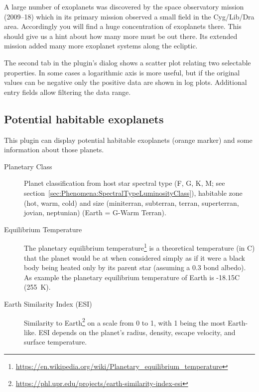 A large number of exoplanets was discovered by the  
space observatory mission (2009--18) which in its primary mission observed a small field in the Cyg/Lib/Dra area. Accordingly 
you will find a huge concentration of exoplanets there. This should give us a hint about how many more must be out there.
Its extended mission added many more exoplanet systems along the ecliptic.

The second tab in the plugin's dialog shows a scatter plot relating
two selectable properties.  In some cases a logarithmic axis is more
useful, but if the original values can be negative only the positive
data are shown in log plots. Additional entry fields allow filtering
the data range.

\subsection{Potential habitable exoplanets}
\label{sec:plugins:Exoplanets:habitable}
This plugin can display potential habitable exoplanets (orange marker) and some information about those planets.

\begin{description}
\item[Planetary Class] Planet classification from host star spectral
  type (F, G, K, M; see
  section~\ref{sec:Phenomena:SpectralTypeLuminosityClass}), habitable
  zone (hot, warm, cold) and size (miniterran, subterran, terran,
  superterran, jovian, neptunian) (Earth = G-Warm Terran).
\item[Equilibrium Temperature] The planetary equilibrium
  temperature\footnote{\url{https://en.wikipedia.org/wiki/Planetary_equilibrium_temperature}}
  is a theoretical temperature (in \degree C) that the planet would be
  at when considered simply as if it were a black body being heated
  only by its parent star (assuming a 0.3 bond albedo). As example the
  planetary equilibrium temperature of Earth is -18.15\degree C (255~K).
\item[Earth Similarity Index (ESI)] Similarity to
  Earth\footnote{\url{https://phl.upr.edu/projects/earth-similarity-index-esi}}
  on a scale from 0 to 1, with 1 being the most Earth-like. ESI
  depends on the planet's radius, density, escape velocity, and
  surface temperature.
\end{description}


